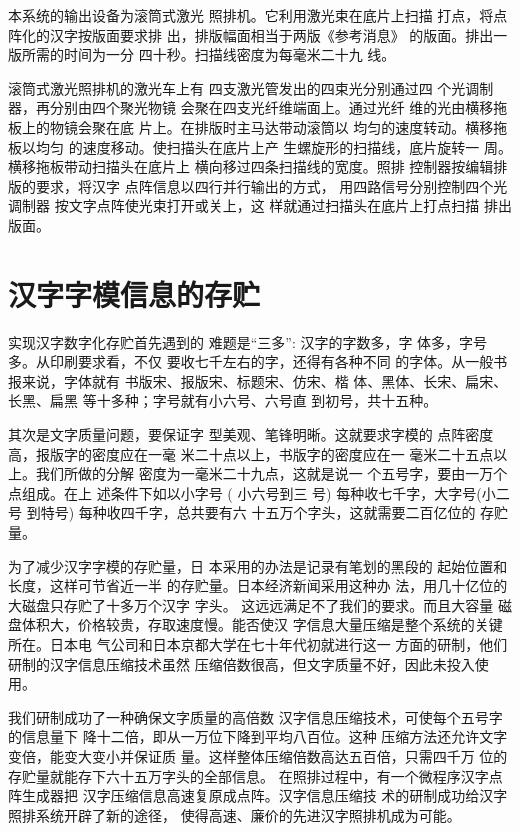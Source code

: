 \documentclass[b5paper]{ctexart}
\begin{document}
本系统的输出设备为滚筒式激光
照排机。它利用激光束在底片上扫描
打点，将点阵化的汉字按版面要求排
出，排版幅面相当于两版《参考消息》
的版面。排出一版所需的时间为一分
四十秒。扫描线密度为每毫米二十九
线。

滚筒式激光照排机的激光车上有
四支激光管发出的四束光分别通过四
个光调制器，再分别由四个聚光物镜
会聚在四支光纤维端面上。通过光纤
维的光由横移拖板上的物镜会聚在底
片上。在排版时主马达带动滚筒以
均匀的速度转动。横移拖板以均匀
的速度移动。使扫描头在底片上产
生螺旋形的扫描线，底片旋转一
周。横移拖板带动扫描头在底片上
横向移过四条扫描线的宽度。照排
控制器按编辑排版的要求，将汉字
点阵信息以四行并行输出的方式，
用四路信号分别控制四个光调制器
按文字点阵使光束打开或关上，这
样就通过扫描头在底片上打点扫描
排出版面。


\section*{汉字字模信息的存贮}
实现汉字数字化存贮首先遇到的
难题是“三多”: 汉字的字数多，字
体多，字号多。从印刷要求看，不仅
要收七千左右的字，还得有各种不同
的字体。从一般书报来说，字体就有
书版宋、报版宋、标题宋、仿宋、楷
体、黑体、长宋、扁宋、长黑、扁黑
等十多种；字号就有小六号、六号直
到初号，共十五种。

其次是文字质量问题，要保证字
型美观、笔锋明晰。这就要求字模的
点阵密度高，报版字的密度应在一毫
米二十点以上，书版字的密度应在一
毫米二十五点以上。我们所做的分解
密度为一毫米二十九点，这就是说一
个五号字，要由一万个点组成。在上
述条件下如以小字号 ( 小六号到三
号) 每种收七千字，大字号(小二号
到特号) 每种收四千字，总共要有六
十五万个字头，这就需要二百亿位的
存贮量。

为了减少汉字字模的存贮量，日
本采用的办法是记录有笔划的黑段的
起始位置和长度，这样可节省近一半
的存贮量。日本经济新闻采用这种办
法，用几十亿位的大磁盘只存贮了十多万个汉字
字头。 这远远满足不了我们的要求。而且大容量
 磁盘体积大，价格较贵，存取速度慢。能否使汉
字信息大量压缩是整个系统的关键所在。日本电
气公司和日本京都大学在七十年代初就进行这一
方面的研制，他们研制的汉字信息压缩技术虽然
压缩倍数很高，但文字质量不好，因此未投入使
用。　　


我们研制成功了一种确保文字质量的高倍数
汉字信息压缩技术，可使每个五号字的信息量下
降十二倍，即从一万位下降到平均八百位。这种
压缩方法还允许文字变倍，能变大变小并保证质
量。这样整体压缩倍数高达五百倍，只需四千万
位的存贮量就能存下六十五万字头的全部信息。
在照排过程中，有一个微程序汉字点阵生成器把
汉字压缩信息高速复原成点阵。汉字信息压缩技
术的研制成功给汉字照排系统开辟了新的途径，
使得高速、廉价的先进汉字照排机成为可能。
\end{document}
